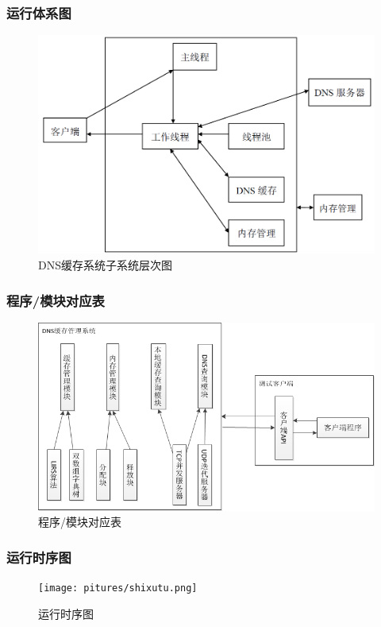 \documentclass[12pt, a4paper, titlepage]{article}
\begin{document}
\subsubsection{运行体系图}
\begin{figure}[H]
\centering
\includegraphics[keepaspectratio, scale=0.5]{pitures/xitongyunxing.png}
\caption{DNS缓存系统子系统层次图}
\end{figure}
\subsubsection{程序/模块对应表}
\begin{figure}[H]
\centering
\includegraphics[keepaspectratio, scale=0.7]{pitures/struct.png}
\caption{程序/模块对应表}
\end{figure}
\subsubsection{运行时序图}
\begin{figure}[H]
\centering
\texttt{[image: pitures/shixutu.png]}
\caption{运行时序图}
\end{figure}
\end{document}
